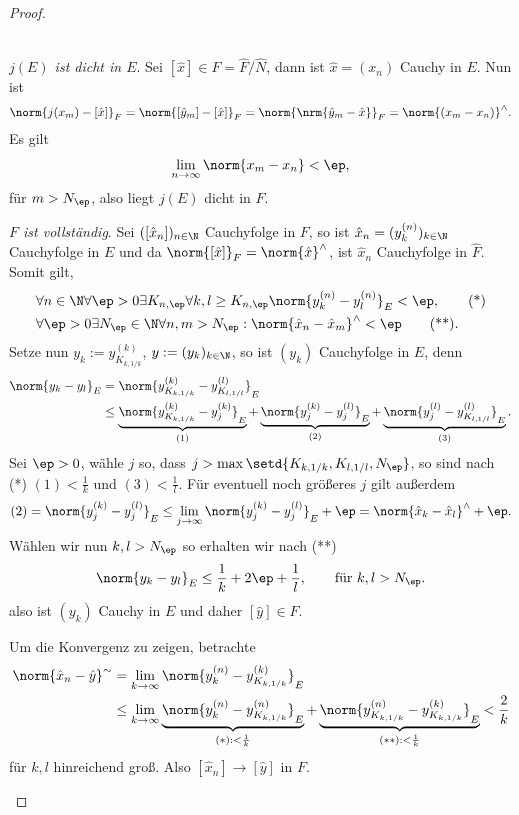 \begin{proof}
\begin{proofenum}
\begin{align*}
\end{align*}
\item \textit{$j(E)$ ist dicht in $E$}. Sei $[\hat{x}]\in F=\hat{F}/\hat{N}$,
dann ist $\hat{x}=(x_n)$ Cauchy in $E$. Nun ist
\begin{align*}
\norm{j(x_m)-[\hat{x}]}_F = \norm{[\hat{y}_m] - [\hat{x}]}_F
= \norm{\nrm{\hat{y}_m-\hat{x}}}_F = \norm{(x_m-x_n)}^{\land}.
\end{align*}
Es gilt
\begin{align*}
\lim\limits_{n\to\infty} \norm{x_m-x_n} < \ep,
\end{align*}
für $m> N_\ep$, also liegt $j(E)$ dicht in $F$.
\item \textit{$F$ ist vollständig}. Sei $([\hat{x}_n])_{n\in\N}$ Cauchyfolge in
$F$, so ist $\hat{x}_n=(y_k^{(n)})_{k\in\N}$ Cauchyfolge in $E$ und da
$\norm{[\hat{x}]}_F = \norm{\hat{x}}^\land$, ist $\hat{x}_n$ Cauchyfolge in
$\hat{F}$. Somit gilt,
\begin{align*}
&\forall n\in\N \forall \ep > 0 \exists K_{n,\ep} \forall k,l \ge K_{n,\ep}
\norm{y_k^{(n)}-y_l^{(n)}}_E < \ep,\tag{*}\\
&\forall \ep > 0 \exists N_\ep \in\N \forall n,m>N_\ep :
\norm{\hat{x}_n-\hat{x}_m}^\land <\ep\tag{**}.
\end{align*}
Setze nun $y_k:=y_{K_{k,1/k}}^{(k)}$, $y:=(y_k)_{k\in\N}$, so ist $(y_k)$
Cauchyfolge in $E$, denn
\begin{align*}
\norm{y_k-y_l}_E &= \norm{y_{K_{k,1/k}}^{(k)}-y_{K_{l,1/l}}^{(l)}}_E\\
&\le \underbrace{\norm{y_{K_{k,1/k}}^{(k)}-y_j^{(k)}}_E}_{(1)} +
\underbrace{\norm{y_j^{(k)}-y_j^{(l)}}_E}_{(2)} +
\underbrace{\norm{y_j^{(l)}-y_{K_{l,1/l}}^{(l)}}_E}_{(3)}.
\end{align*}
Sei $\ep > 0$, wähle $j$ so, dass $j> \max\setd{K_{k,1/k},K_{l,1/l},N_\ep}$, so
sind nach (*) $(1)<\frac{1}{k}$ und $(3)<\frac{1}{l}$. Für eventuell noch
größeres $j$ gilt außerdem
\begin{align*}
(2) = \norm{y_j^{(k)}-y_j^{(l)}}_E \le \lim\limits_{j\to\infty}
\norm{y_j^{(k)}-y_j^{(l)}}_E + \ep = \norm{\hat{x}_k - \hat{x}_l}^\land + \ep.
\end{align*}
Wählen wir nun $k,l>N_\ep$ so erhalten wir nach (**) 
\begin{align*}
\norm{y_k-y_l}_E \le \frac{1}{k} + 2\ep + \frac{1}{l},\qquad \text{für }k,l >
N_\ep.
\end{align*}
also ist $(y_k)$ Cauchy in $E$ und daher $[\hat{y}]\in F$.

Um die Konvergenz zu zeigen, betrachte
\begin{align*}
\norm{\hat{x}_n - \hat{y}}^\sim &= \lim\limits_{k\to\infty}
\norm{y_k^{(n)}-y_{K_{k,1/k}}^{(k)}}_E\\
&\le\lim\limits_{k\to\infty}
\underbrace{\norm{y_k^{(n)}-y_{K_{k,1/k}}^{(n)}}_E}_{(*): < \frac{1}{k}} +
\underbrace{\norm{y_{K_{k,1/k}}^{(n)}- y_{K_{k,1/k}}^{(k)}}_E}_{(**): <
\frac{1}{k}} < \frac{2}{k}
\end{align*}
für $k,l$ hinreichend groß. Also $[\hat{x}_n]\to [\hat{y}]$ in $F$.\qedhere
\end{proofenum}
\end{proof}

